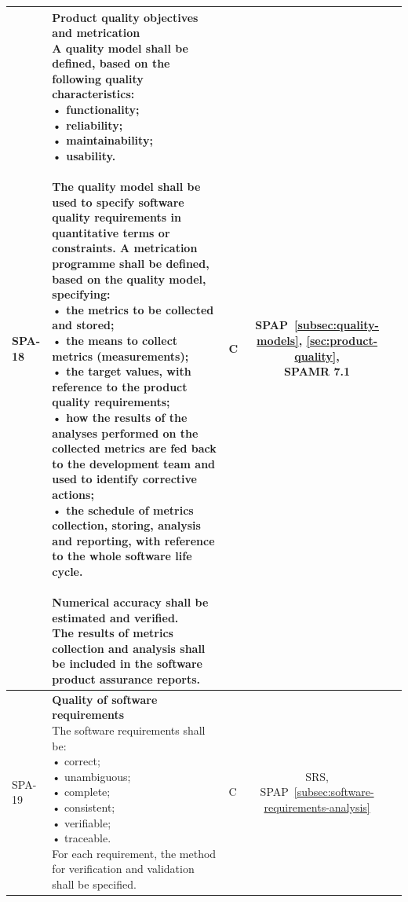 {\begin{xltabular}{\textwidth}{|l|L|l|S|S|}
        SPA-18 &
        {\textbf{Product quality objectives and metrication} \newline
        A quality model shall be defined, based on the following quality characteristics: \newline
        • functionality; \newline
        • reliability; \newline
        • maintainability; \newline
        • usability. \newline
         \newline
        The quality model shall be used to specify software quality requirements in quantitative terms or constraints. A metrication programme shall be defined, based on the quality model, specifying: \newline
        • the metrics to be collected and stored; \newline
        • the means to collect metrics (measurements); \newline
        • the target values, with reference to the product quality requirements; \newline
        • how the results of the analyses performed on the collected metrics are fed back to the development team and used to identify corrective actions; \newline
        • the schedule of metrics collection, storing, analysis and reporting, with reference to the whole software life cycle. \newline
         \newline
        Numerical accuracy shall be estimated and verified. \newline
        The results of metrics collection and analysis shall be included in the software product assurance reports.} &
        C &
        {SPAP~\ref{subsec:quality-models}, \ref{sec:product-quality}, \newline SPAMR 7.1} &
        \\ \hline

        SPA-19 &
        {\textbf{Quality of software requirements} \newline
        The software requirements shall be: \newline
        • correct; \newline
        • unambiguous; \newline
        • complete; \newline
        • consistent; \newline
        • verifiable; \newline
        • traceable. \newline
        For each requirement, the method for verification and validation shall be specified.} &
        C &
        {SRS, \newline SPAP~\ref{subsec:software-requirements-analysis}} &
        \\ \hline


\end{xltabular}}
